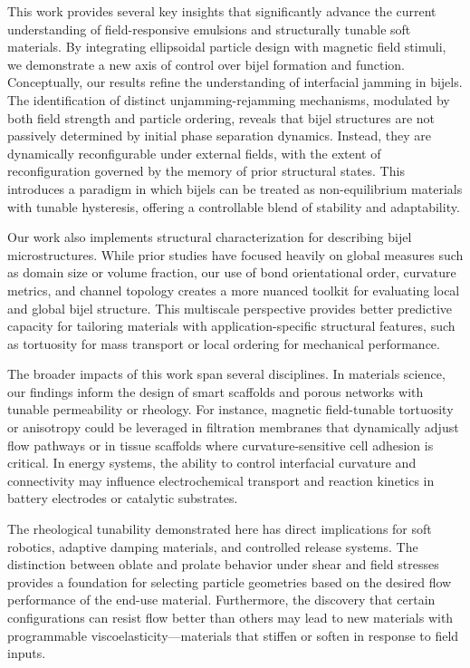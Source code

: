 This work provides several key insights that significantly advance the current understanding of field-responsive emulsions and structurally 
tunable soft materials. By integrating ellipsoidal particle design with magnetic field stimuli, we demonstrate a new axis of control over 
bijel formation and function. 
Conceptually, our results refine the understanding of interfacial jamming in bijels. The identification of distinct 
unjamming-rejamming mechanisms, modulated by both field strength and particle ordering, reveals that bijel structures are not passively 
determined by initial phase separation dynamics. Instead, they are dynamically reconfigurable under external fields, with the extent of 
reconfiguration governed by the memory of prior structural states. This introduces a paradigm in which bijels can be treated as 
non-equilibrium materials with tunable hysteresis, offering a controllable blend of stability and adaptability.

Our work also implements structural characterization for describing bijel microstructures. While prior studies have focused heavily on global 
measures such as domain size or volume fraction, our use of bond orientational order, curvature metrics, and channel topology creates a more 
nuanced toolkit for evaluating local and global bijel structure. This multiscale perspective provides better predictive capacity for 
tailoring materials with application-specific structural features, such as tortuosity for mass transport or local ordering for mechanical 
performance.

The broader impacts of this work span several disciplines. In materials science, our findings inform the design of smart scaffolds and 
porous networks with tunable permeability or rheology. For instance, magnetic field-tunable tortuosity or anisotropy could 
be leveraged in filtration membranes that dynamically adjust flow pathways or in tissue scaffolds where curvature-sensitive cell adhesion 
is critical. In energy systems, the ability to control interfacial curvature and connectivity may influence electrochemical transport and 
reaction kinetics in battery electrodes or catalytic substrates.

The rheological tunability demonstrated here has direct implications for soft robotics, adaptive damping materials, and controlled release 
systems. The distinction between oblate and prolate behavior under shear and field stresses provides a foundation for selecting particle 
geometries based on the desired flow performance of the end-use material. Furthermore, the discovery that certain configurations can resist 
flow better than others may lead to new materials with programmable viscoelasticity—materials that stiffen or soften in response to field inputs.

